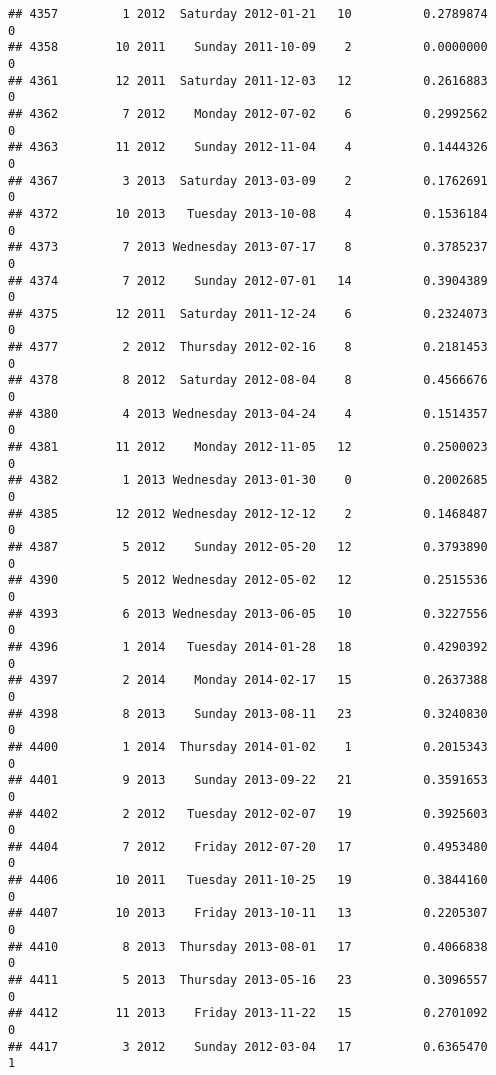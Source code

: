 \documentclass[
]{article}
\begin{document}
\begin{verbatim}
## 4357         1 2012  Saturday 2012-01-21   10          0.2789874             0
## 4358        10 2011    Sunday 2011-10-09    2          0.0000000             0
## 4361        12 2011  Saturday 2011-12-03   12          0.2616883             0
## 4362         7 2012    Monday 2012-07-02    6          0.2992562             0
## 4363        11 2012    Sunday 2012-11-04    4          0.1444326             0
## 4367         3 2013  Saturday 2013-03-09    2          0.1762691             0
## 4372        10 2013   Tuesday 2013-10-08    4          0.1536184             0
## 4373         7 2013 Wednesday 2013-07-17    8          0.3785237             0
## 4374         7 2012    Sunday 2012-07-01   14          0.3904389             0
## 4375        12 2011  Saturday 2011-12-24    6          0.2324073             0
## 4377         2 2012  Thursday 2012-02-16    8          0.2181453             0
## 4378         8 2012  Saturday 2012-08-04    8          0.4566676             0
## 4380         4 2013 Wednesday 2013-04-24    4          0.1514357             0
## 4381        11 2012    Monday 2012-11-05   12          0.2500023             0
## 4382         1 2013 Wednesday 2013-01-30    0          0.2002685             0
## 4385        12 2012 Wednesday 2012-12-12    2          0.1468487             0
## 4387         5 2012    Sunday 2012-05-20   12          0.3793890             0
## 4390         5 2012 Wednesday 2012-05-02   12          0.2515536             0
## 4393         6 2013 Wednesday 2013-06-05   10          0.3227556             0
## 4396         1 2014   Tuesday 2014-01-28   18          0.4290392             0
## 4397         2 2014    Monday 2014-02-17   15          0.2637388             0
## 4398         8 2013    Sunday 2013-08-11   23          0.3240830             0
## 4400         1 2014  Thursday 2014-01-02    1          0.2015343             0
## 4401         9 2013    Sunday 2013-09-22   21          0.3591653             0
## 4402         2 2012   Tuesday 2012-02-07   19          0.3925603             0
## 4404         7 2012    Friday 2012-07-20   17          0.4953480             0
## 4406        10 2011   Tuesday 2011-10-25   19          0.3844160             0
## 4407        10 2013    Friday 2013-10-11   13          0.2205307             0
## 4410         8 2013  Thursday 2013-08-01   17          0.4066838             0
## 4411         5 2013  Thursday 2013-05-16   23          0.3096557             0
## 4412        11 2013    Friday 2013-11-22   15          0.2701092             0
## 4417         3 2012    Sunday 2012-03-04   17          0.6365470             1

\end{verbatim}
\end{document}
